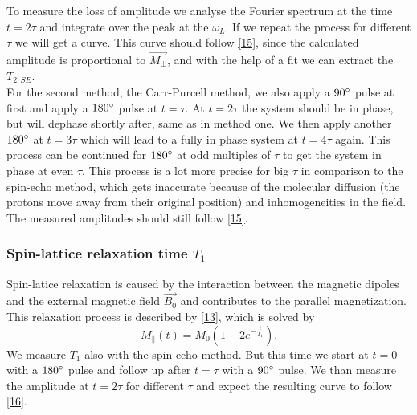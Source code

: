To measure the loss of amplitude we analyse the Fourier spectrum at the time $t=2\tau$ and integrate over the peak at the $\omega_L$. If we repeat the process for different $\tau$ we will get a curve. This curve should follow \eqref{15}, since the calculated amplitude is proportional to $\vec{M_{\perp}}$, and with the help of a fit we can extract the $T_{2,SE}$.
\vspace{3mm} \\
For the second method, the Carr-Purcell method, we also apply a $90\degree$ pulse at first and apply a $180\degree$ pulse at $t=\tau$. At $t=2\tau$ the system should be in phase, but will dephase shortly after, same as in method one. We then apply another $180\degree$ at $t=3\tau$ which will lead to a fully in phase system at $t=4\tau$ again. This process can be continued for $180\degree$ at odd multiples of $\tau$ to get the system in phase at even $\tau$. This process is a lot more precise for big $\tau$ in comparison to the spin-echo method, which gets inaccurate because of the molecular diffusion (the protons move away from their original position) and inhomogeneities in the field.\\
The measured amplitudes should still follow \eqref{15}.
\subsubsection{Spin-lattice relaxation time $T_{1}$}
Spin-latice relaxation is caused by the interaction between the magnetic dipoles and the external magnetic field $\vec{B_0}$ and contributes to the parallel magnetization. This relaxation process is described by \eqref{13}, which is solved by
\begin{equation}
	\label{16}
	M_{\parallel}(t) = M_{0}(1-2e^{-\frac{t}{T_{1}}}).
\end{equation}
We measure $T_1$ also with the spin-echo method. But this time we start at $t=0$ with a $180\degree$ pulse and follow up after $t=\tau$ with a $90\degree$ pulse. We than measure the amplitude at $t=2\tau$ for different $\tau$ and expect the resulting curve to follow \eqref{16}.
